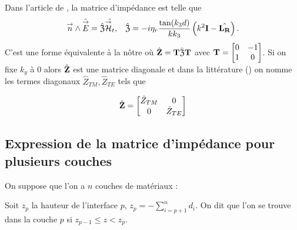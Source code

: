         Dans l'article de \cite{marceaux_high-order_2000}, la matrice d'impédance est telle que
        \begin{align*}
             \vn \pvect \hat{\vE} = \hat{\mathfrak{Z}} \hat{\vH_t}, && \hat{\mathfrak{Z}} = -i\eta_r\frac{\tan(k_3d)}{kk_3}\left(k^2\mI - \hat{\mLR}\right).
        \end{align*}
        C'est une forme équivalente à la nôtre où \(\hat{\mZ} = \mT\hat{\mathfrak{Z}}\mT\) avec \(\mT = \begin{bmatrix}0&-1\\1&0\end{bmatrix}\).
        Si on fixe \(k_y\) à \(0\) alors \(\hat \mZ\) est une matrice diagonale et dans la littérature (\cite{stupfel_implementation_2015,aubakirov_electromagnetic_2014,hoppe_impedance_1995}) on nomme les termes diagonaux \(\hat Z_{TM}, \hat Z_{TE}\) tels que
        
        \begin{equation*}
            \hat \mZ =
            \begin{bmatrix}
                \hat Z_{TM} & 0
                \\
                0 & \hat Z_{TE}
            \end{bmatrix}
        \end{equation*}

  \subsection{Expression de la matrice d'impédance pour plusieurs couches}
    On suppose que l'on a \(n\) couches de matériaux :
    \begin{figure}[h!btp]
        \centering
        \begin{tikzpicture}
            
        \end{tikzpicture}
    \end{figure}

    Soit \(z_p\) la hauteur de l'interface \(p\), \(z_p = -\sum_{i=p+1}^{n} d_{i}\). On dit que l'on se trouve dans la couche \(p\) si \(z_{p-1} \le z < z_p \).


